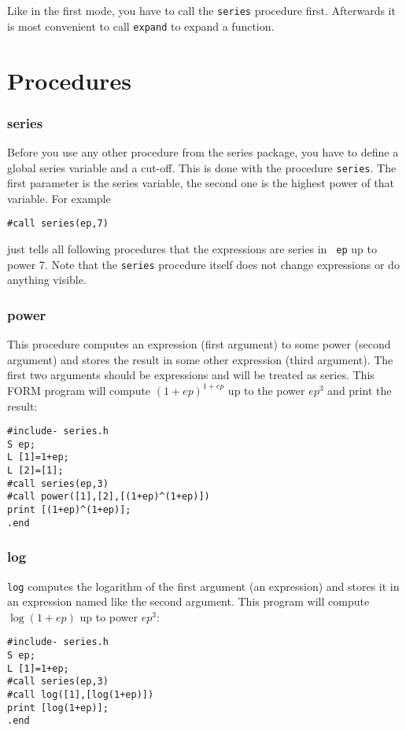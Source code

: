 \documentclass{article}
\begin{document}
Like in the first mode, you have to call the {\tt series} procedure
first. Afterwards it is most convenient to call {\tt expand} to expand a
function.



\section{Procedures}
\label{sec:proc}


\subsubsection{series}
\label{sec:series}

Before you use any other procedure from the series package, you have to define a global
series variable and a cut-off. This is done with the
procedure {\tt series}. The first parameter is the series variable, the
second one is the highest power of that variable. For example
\begin{verbatim}
#call series(ep,7)
\end{verbatim}
just tells all following procedures that the expressions are series in {\tt
  ep} up to power 7. Note that the {\tt series} procedure itself does
not change expressions or do anything visible.

\subsubsection{power}
\label{sec:pow}

This procedure computes an expression (first argument) to some power
(second argument) and stores the result in some other expression (third
argument). The first two arguments should be expressions and will be
treated as series. This FORM program will compute $(1+ep)^{1+ep}$ up to
the power $ep^3$ and print the result:
\begin{verbatim}
#include- series.h
S ep;
L [1]=1+ep;
L [2]=[1];
#call series(ep,3)
#call power([1],[2],[(1+ep)^(1+ep)])
print [(1+ep)^(1+ep)];
.end
\end{verbatim}


\subsubsection{log}
\label{sec:log}

{\tt log} computes the logarithm of the first argument (an
expression) and stores it in an expression named like the second
argument. This program will compute $\log (1+ep)$ up to power $ep^3$:
\begin{verbatim}
#include- series.h
S ep;
L [1]=1+ep;
#call series(ep,3)
#call log([1],[log(1+ep)])
print [log(1+ep)];
.end
\end{verbatim}
\end{document}
